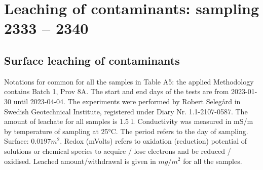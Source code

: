 \documentclass[algorithms,article,submit,pdftex,moreauthors]{Definitions/mdpi}
\begin{document}
\section[\appendixname~\thesection]{Leaching of contaminants: sampling 2333 -- 2340}
\subsection[\appendixname~\thesubsection]{Surface leaching of contaminants}

Notations for common for all the samples in Table A5: the applied Methodology contains Batch 1, Prov 8A. The start and end days of the tests are from 2023-01-30 until 2023-04-04. The experiments were performed by Robert Selegård in Swedish Geotechnical Institute, registered under Diary Nr. 1.1-2107-0587. The amount of leachate for all samples is 1.5 l. Conductivity was measured in mS/m by temperature of sampling at 25°C. The period refers to the day of sampling. Surface: $0.0197 m^2$. Redox (mVolts) refers to oxidation (reduction) potential of solutions or chemical species to acquire / lose electrons and be reduced / oxidised. Leached amount/withdrawal is given in $mg/m^2$ for all the samples.
\end{document}
